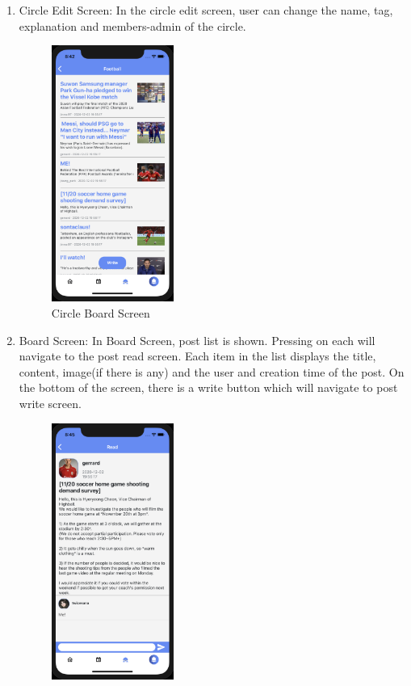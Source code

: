 \documentclass[conference]{IEEEtran}
\begin{document}
\begin{enumerate}
\begin{figure}[h]
        \label{fig:my_label}
    \end{figure}
    \item Circle Edit Screen: In the circle edit screen, user can change the name, tag, explanation and members-admin of the circle.
    \begin{figure}[h]
        \centering
        \includegraphics[width=4cm]{images/board.png}
        \caption{Circle Board Screen}
        \label{fig:my_label}
    \end{figure}
    \item Board Screen: In Board Screen, post list is shown. Pressing on each will navigate to the post read screen. Each item in the list displays the title, content, image(if there is any) and the user and creation time of the post. On the bottom of the screen, there is a write button which will navigate to post write screen.
    \begin{figure}[h]
        \centering
        \includegraphics[width=4cm]{images/read1.png}

\end{figure}
\end{enumerate}
\end{document}

